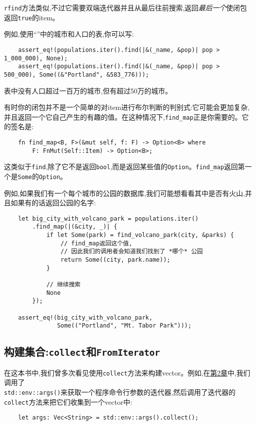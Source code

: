 \texttt{rfind}方法类似,不过它需要双端迭代器并且从最后往前搜索,返回\emph{最后一个}使闭包返回\texttt{true}的item。

例如,使用“”中的城市和人口的表,你可以写:
\begin{verbatim}
    assert_eq!(populations.iter().find(|&(_name, &pop)| pop > 1_000_000), None);
    assert_eq!(populations.iter().find(|&(_name, &pop)| pop > 500_000), Some((&"Portland", &583_776)));
\end{verbatim}

表中没有人口超过一百万的城市,但有超过50万的城市。

有时你的闭包并不是一个简单的对item进行布尔判断的判别式:它可能会更加复杂,并且返回一个它自己产生的有趣的值。在这种情况下,\texttt{find\_map}正是你需要的。它的签名是:
\begin{verbatim}
    fn find_map<B, F>(&mut self, f: F) -> Option<B> where
        F: FnMut(Self::Item) -> Option<B>;
\end{verbatim}

这类似于\texttt{find},除了它不是返回\texttt{bool},而是返回某些值的\texttt{Option}。\texttt{find\_map}返回第一个是\texttt{Some}的\texttt{Option}。

例如,如果我们有一个每个城市的公园的数据库,我们可能想看看其中是否有火山,并且如果有的话返回公园的名字:
\begin{verbatim}
    let big_city_with_volcano_park = populations.iter()
        .find_map(|(&city, _)| {
            if let Some(park) = find_volcano_park(city, &parks) {
                // find_map返回这个值,
                // 因此我们的调用者会知道我们找到了 *哪个* 公园
                return Some((city, park.name));
            }

            // 继续搜索
            None
        });

    assert_eq!(big_city_with_volcano_park,
               Some(("Portland", "Mt. Tabor Park")));
\end{verbatim}

\subsection{构建集合:\texttt{collect}和\texttt{FromIterator}}\label{BuildColl}
在这本书中,我们曾多次看见使用\texttt{collect}方法来构建vector。例如,在\hyperref[ch02]{第2章}中,我们调用了\\
\texttt{std::env::args()}来获取一个程序命令行参数的迭代器,然后调用了迭代器的\texttt{collect}方法来把它们收集到一个vector中:
\begin{verbatim}
    let args: Vec<String> = std::env::args().collect();
\end{verbatim}

